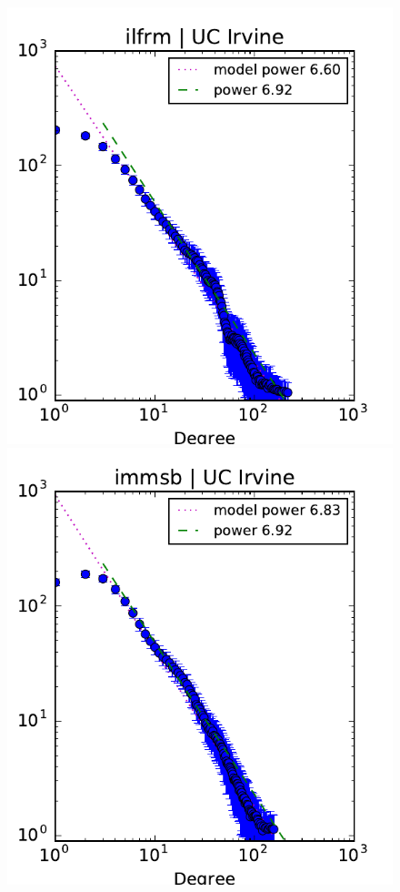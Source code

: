 \begin{figure}[h]
	\centering
	
	\includegraphics[scale=0.4]{img/ilfrm_irvine_d}
	\endminipage
	\includegraphics[scale=0.4]{img/immsb_irvine_d}

\end{figure}
